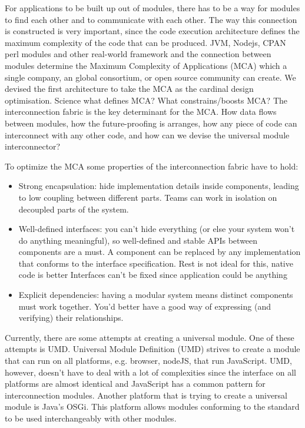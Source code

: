 For applications to be built up out of modules, there has to be a way for modules to find each other and to communicate with each other. The way this connection is constructed is very important, since the code execution architecture defines the maximum complexity of the code that can be produced. JVM, Nodejs, CPAN perl modules and other real-world framework and the connection between modules determine the Maximum Complexity of Applications (MCA) which a single company, an global consortium, or open source community can create. We devised the first architecture to take the MCA as the cardinal design optimisation. Science what defines MCA? What constrains/boosts MCA? The interconnection fabric is the key determinant for the MCA. How data flows between modules, how the future-proofing is arranges, how any piece of code can interconnect with any other code, and how can we devise the universal module interconnector?

To optimize the MCA some properties of the interconnection fabric have to hold:
\begin{itemize}
	\item Strong encapsulation: hide implementation details inside components, leading to low coupling between different parts. Teams can work in isolation on decoupled parts of the system.
	\item Well-defined interfaces: you can’t hide everything (or else your system won’t do anything meaningful), so well-defined and stable APIs between components are a must. A component can be replaced by any implementation that conforms to the interface specification. Rest is not ideal for this, native code is better Interfaces can't be fixed since application could be anything
	\item Explicit dependencies: having a modular system means distinct components must work together. You’d better have a good way of expressing (and verifying) their relationships.
\end{itemize}

Currently, there are some attempts at creating a universal module. One of these attempts is UMD. Universal Module Definition (UMD) strives to create a module that can run on all platforms, e.g. browser, nodeJS, that run JavaScript. UMD, however, doesn't have to deal with a lot of complexities since the interface on all platforms are almost identical and JavaScript has a common pattern for interconnection modules. Another platform that is trying to create a universal module is Java's OSGi. This platform allows modules conforming to the standard to be used interchangeably with other modules. 




